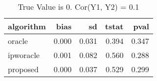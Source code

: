 \begin{table}[h!]

\caption{True Value is 0. Cor(Y1, Y2) = 0.1}
\centering
\begin{tabular}[t]{lrrrr}
\toprule
algorithm & bias & sd & tstat & pval\\
\midrule
oracle & 0.000 & 0.031 & 0.394 & 0.347\\
ipworacle & 0.001 & 0.082 & 0.560 & 0.288\\
proposed & 0.000 & 0.037 & 0.529 & 0.299\\
\bottomrule
\end{tabular}
\end{table}
